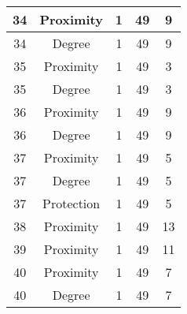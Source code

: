 \documentclass[results.tex]{subfiles}
\begin{document}
\begin{center}
\begin{tabular}{| c || c | c | c | c |}
            \hline
            34                      & Proximity                    & 1                      & 49                      & 9                    \\
            \hline
            34                      & Degree                       & 1                      & 49                      & 9                    \\
            \hline
            35                      & Proximity                    & 1                      & 49                      & 3                    \\
            \hline
            35                      & Degree                       & 1                      & 49                      & 3                    \\
            \hline
            36                      & Proximity                    & 1                      & 49                      & 9                    \\
            \hline
            36                      & Degree                       & 1                      & 49                      & 9                    \\
            \hline
            37                      & Proximity                    & 1                      & 49                      & 5                    \\
            \hline
            37                      & Degree                       & 1                      & 49                      & 5                    \\
            \hline
            37                      & Protection                   & 1                      & 49                      & 5                    \\
            \hline
            38                      & Proximity                    & 1                      & 49                      & 13                   \\
            \hline
            39                      & Proximity                    & 1                      & 49                      & 11                   \\
            \hline
            40                      & Proximity                    & 1                      & 49                      & 7                    \\
            \hline
            40                      & Degree                       & 1                      & 49                      & 7                    \\

\end{tabular}
\end{center}
\end{document}
